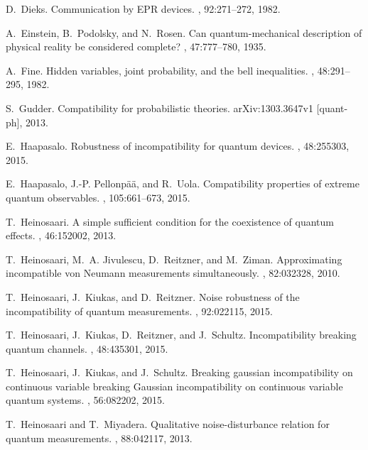\documentclass[12pt]{iopart}
\theoremstyle{definition}
\begin{document}
{\begin{thebibliography}{10}
D.~Dieks.
\newblock Communication by {EPR} devices.
, 92:271--272, 1982.

A.~Einstein, B.~Podolsky, and N.~Rosen.
\newblock Can quantum-mechanical description of physical reality be considered
  complete?
, 47:777--780, 1935.

A.~Fine.
\newblock Hidden variables, joint probability, and the bell inequalities.
, 48:291--295, 1982.

S.~Gudder.
\newblock Compatibility for probabilistic theories.
\newblock arXiv:1303.3647v1 [quant-ph], 2013.

E.~Haapasalo.
\newblock Robustness of incompatibility for quantum devices.
, 48:255303, 2015.

E.~Haapasalo, J.-P. Pellonp\"{a}\"{a}, and R.~Uola.
\newblock Compatibility properties of extreme quantum observables.
, 105:661--673, 2015.

T.~Heinosaari.
\newblock A simple sufficient condition for the coexistence of quantum effects.
, 46:152002, 2013.

T.~Heinosaari, M.~A. Jivulescu, D.~Reitzner, and M.~Ziman.
\newblock Approximating incompatible von {N}eumann measurements simultaneously.
, 82:032328, 2010.

T.~Heinosaari, J.~Kiukas, and D.~Reitzner.
\newblock Noise robustness of the incompatibility of quantum measurements.
, 92:022115, 2015.

T.~Heinosaari, J.~Kiukas, D.~Reitzner, and J.~Schultz.
\newblock Incompatibility breaking quantum channels.
, 48:435301, 2015.

T.~Heinosaari, J.~Kiukas, and J.~Schultz.
\newblock Breaking gaussian incompatibility on continuous variable breaking
  {G}aussian incompatibility on continuous variable quantum systems.
, 56:082202, 2015.

T.~Heinosaari and T.~Miyadera.
\newblock Qualitative noise-disturbance relation for quantum measurements.
, 88:042117, 2013.


\end{thebibliography}}
\end{document}
